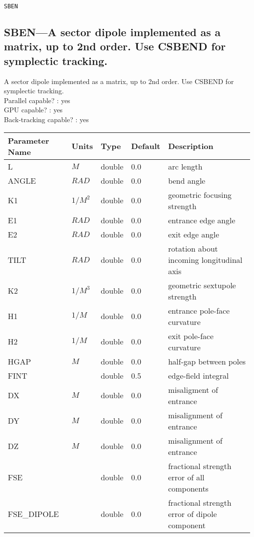 \newpage
\begin{center}{\Large\verb|SBEN|}\end{center}
\subsection{SBEN---A sector dipole implemented as a matrix, up to 2nd order. Use CSBEND for symplectic tracking.}
A sector dipole implemented as a matrix, up to 2nd order. Use CSBEND for symplectic tracking.
\\
Parallel capable? : yes\\
GPU capable? : yes\\
Back-tracking capable? : yes\\
\begin{tabular}{|l|l|l|l|p{\descwidth}|} \hline
Parameter Name & Units & Type & Default & Description \\ \hline 
L & $M$ & double &  0.0 & arc length  \\ \hline 
ANGLE & $RAD$ & double &  0.0 & bend angle  \\ \hline 
K1 & $1/M^{2}$ & double &  0.0 & geometric focusing strength  \\ \hline 
E1 & $RAD$ & double &  0.0 & entrance edge angle  \\ \hline 
E2 & $RAD$ & double &  0.0 & exit edge angle  \\ \hline 
TILT & $RAD$ & double &  0.0 & rotation about incoming longitudinal axis  \\ \hline 
K2 & $1/M^{3}$ & double &  0.0 & geometric sextupole strength  \\ \hline 
H1 & $1/M$ & double &  0.0 & entrance pole-face curvature  \\ \hline 
H2 & $1/M$ & double &  0.0 & exit pole-face curvature  \\ \hline 
HGAP & $M$ & double &  0.0 & half-gap between poles  \\ \hline 
FINT &  & double &   0.5 & edge-field integral  \\ \hline 
DX & $M$ & double &  0.0 & misaligment of entrance  \\ \hline 
DY & $M$ & double &  0.0 & misalignment of entrance  \\ \hline 
DZ & $M$ & double &  0.0 & misalignment of entrance  \\ \hline 
FSE &  & double &  0.0 & fractional strength error of all components  \\ \hline 
FSE\_DIPOLE &  & double &  0.0 & fractional strength error of dipole component  \\ \hline 

\end{tabular}
